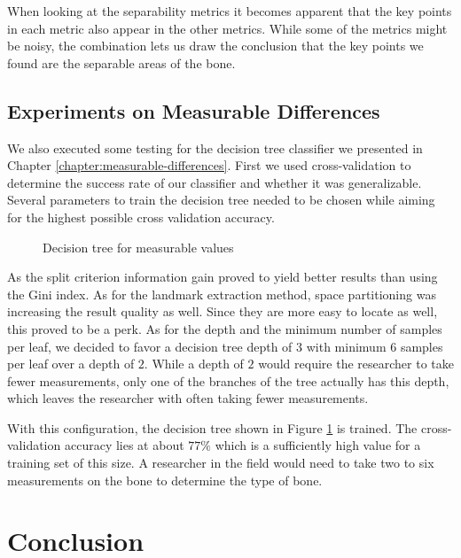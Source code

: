\documentclass[pdftex,12pt,a4paper]{report}
\begin{document}
When looking at the separability metrics it becomes apparent that the key points in each metric also appear in the other metrics. While some of the metrics might be noisy, the combination lets us draw the conclusion that the key points we found are the separable areas of the bone.

\section{Experiments on Measurable Differences}

We also executed some testing for the decision tree classifier we presented in Chapter \ref{chapter:measurable-differences}. First we used cross-validation to determine the success rate of our classifier and whether it was generalizable. Several parameters to train the decision tree needed to be chosen while aiming for the highest possible cross validation accuracy.

\begin{figure}[h]
	\centering
	\begin{subfigure}[b]{0.9\textwidth}
		\centering
		
	\end{subfigure}
	\caption{Decision tree for measurable values}
	\label{fig:result-decision-tree}
\end{figure}

As the split criterion information gain proved to yield better results than using the Gini index. As for the landmark extraction method, space partitioning was increasing the result quality as well. Since they are more easy to locate as well, this proved to be a perk. As for the depth and the minimum number of samples per leaf, we decided to favor a decision tree depth of $3$ with minimum $6$ samples per leaf over a depth of $2$. While a depth of $2$ would require the researcher to take fewer measurements, only one of the branches of the tree actually has this depth, which leaves the researcher with often taking fewer measurements.

With this configuration, the decision tree shown in Figure \ref{fig:result-decision-tree} is trained. The cross-validation accuracy lies at about $77\%$ which is a sufficiently high value for a training set of this size. A researcher in the field would need to take two to six measurements on the bone to determine the type of bone.

\chapter{Conclusion}
\label{chapter:conclusion}
\end{document}
